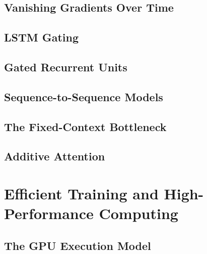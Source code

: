 \subsection{Vanishing Gradients Over Time}


\subsection{LSTM Gating}

\subsection{Gated Recurrent Units}

\subsection{Sequence-to-Sequence Models}

\subsection{The Fixed-Context Bottleneck}

\subsection{Additive Attention}


\section{Efficient Training and High-Performance Computing}
\label{sec:hpc}


\subsection{The GPU Execution Model}

